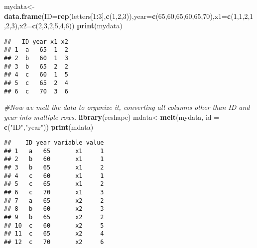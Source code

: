 \documentclass[]{book}
\newenvironment{Shaded}{\begin{snugshade}}{\end{snugshade}}
\newcommand{\KeywordTok}[1]{\textcolor[rgb]{0.13,0.29,0.53}{\textbf{#1}}}
\newcommand{\DataTypeTok}[1]{\textcolor[rgb]{0.13,0.29,0.53}{#1}}
\newcommand{\DecValTok}[1]{\textcolor[rgb]{0.00,0.00,0.81}{#1}}
\newcommand{\StringTok}[1]{\textcolor[rgb]{0.31,0.60,0.02}{#1}}
\newcommand{\CommentTok}[1]{\textcolor[rgb]{0.56,0.35,0.01}{\textit{#1}}}
\newcommand{\OperatorTok}[1]{\textcolor[rgb]{0.81,0.36,0.00}{\textbf{#1}}}
\newcommand{\NormalTok}[1]{#1}
\theoremstyle{definition}
\theoremstyle{definition}
\theoremstyle{definition}
\theoremstyle{remark}
\begin{document}
\begin{Shaded}
\begin{Highlighting}[]
\NormalTok{mydata<-}\KeywordTok{data.frame}\NormalTok{(}\DataTypeTok{ID=}\KeywordTok{rep}\NormalTok{(letters[}\DecValTok{1}\OperatorTok{:}\DecValTok{3}\NormalTok{],}\KeywordTok{c}\NormalTok{(}\DecValTok{1}\NormalTok{,}\DecValTok{2}\NormalTok{,}\DecValTok{3}\NormalTok{)),}\DataTypeTok{year=}\KeywordTok{c}\NormalTok{(}\DecValTok{65}\NormalTok{,}\DecValTok{60}\NormalTok{,}\DecValTok{65}\NormalTok{,}\DecValTok{60}\NormalTok{,}\DecValTok{65}\NormalTok{,}\DecValTok{70}\NormalTok{),}\DataTypeTok{x1=}\KeywordTok{c}\NormalTok{(}\DecValTok{1}\NormalTok{,}\DecValTok{1}\NormalTok{,}\DecValTok{2}\NormalTok{,}\DecValTok{1}\NormalTok{,}\DecValTok{2}\NormalTok{,}\DecValTok{3}\NormalTok{),}\DataTypeTok{x2=}\KeywordTok{c}\NormalTok{(}\DecValTok{2}\NormalTok{,}\DecValTok{3}\NormalTok{,}\DecValTok{2}\NormalTok{,}\DecValTok{5}\NormalTok{,}\DecValTok{4}\NormalTok{,}\DecValTok{6}\NormalTok{))}
\KeywordTok{print}\NormalTok{(mydata)}
\end{Highlighting}
\end{Shaded}

\begin{verbatim}
##   ID year x1 x2
## 1  a   65  1  2
## 2  b   60  1  3
## 3  b   65  2  2
## 4  c   60  1  5
## 5  c   65  2  4
## 6  c   70  3  6
\end{verbatim}

\begin{Shaded}
\begin{Highlighting}[]
\CommentTok{#Now we melt the data to organize it, converting all columns other than ID and year into multiple rows.}
\KeywordTok{library}\NormalTok{(reshape)}
\NormalTok{mdata<-}\KeywordTok{melt}\NormalTok{(mydata, }\DataTypeTok{id =} \KeywordTok{c}\NormalTok{(}\StringTok{"ID"}\NormalTok{,}\StringTok{"year"}\NormalTok{))}
\KeywordTok{print}\NormalTok{(mdata)}
\end{Highlighting}
\end{Shaded}

\begin{verbatim}
##    ID year variable value
## 1   a   65       x1     1
## 2   b   60       x1     1
## 3   b   65       x1     2
## 4   c   60       x1     1
## 5   c   65       x1     2
## 6   c   70       x1     3
## 7   a   65       x2     2
## 8   b   60       x2     3
## 9   b   65       x2     2
## 10  c   60       x2     5
## 11  c   65       x2     4
## 12  c   70       x2     6
\end{verbatim}
\end{document}
